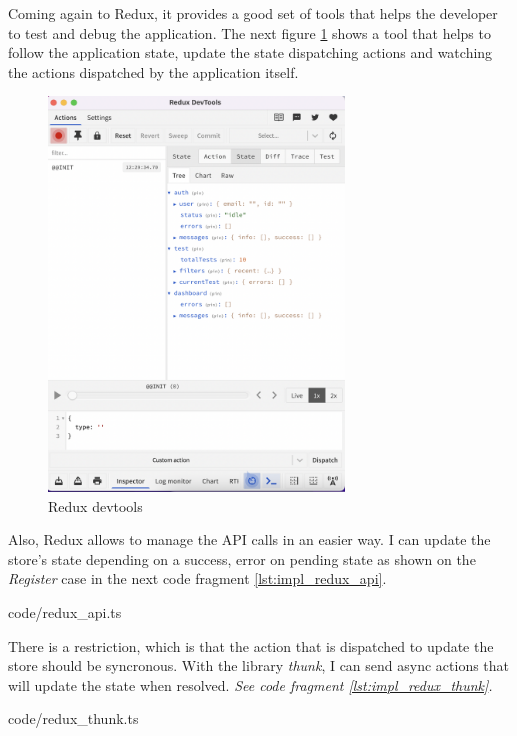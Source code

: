         Coming again to Redux, it provides a good set of tools that helps the developer to test and debug the application. The next figure \ref{fig:Redux devtools} shows a tool that helps to follow the application state, update the state dispatching actions and
        watching the actions dispatched by the application itself.
        \begin{figure}[H]
            \centering
                \includegraphics[width=0.7\textwidth]{assets/redux_devtools.png}
            \caption{Redux devtools}
            \label{fig:Redux devtools}
        \end{figure}

        Also, Redux allows to manage the API calls in an easier way. I can update the store's state depending on a success, error on pending state as
        shown on the \textit{Register} case in the next code fragment \ref{lst:impl_redux_api}.
        
        {code/redux_api.ts}

        There is a restriction, which is that the action that is dispatched to update the store should be syncronous. With the library \textit{thunk}, I can send async actions that will update the state when resolved. \textit{See code fragment \ref{lst:impl_redux_thunk}.}
        
        {code/redux_thunk.ts}

